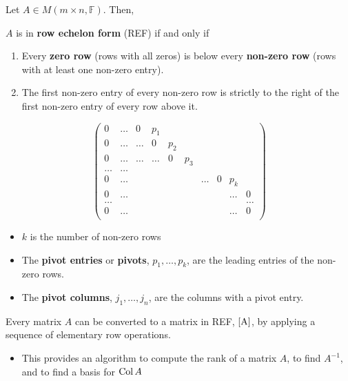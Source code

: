 \documentclass[letterpaper,12pt]{article}
\begin{document}
Let $A \in M(m \times n, \mathbb{F})$. Then,

\begin{definition}
$A$ is in \textbf{row echelon form} (REF) if and only if
\begin{enumerate}
    \item Every \textbf{zero row} (rows with all zeros) is below every \textbf{non-zero row} (rows with at least one non-zero entry).
    \item The first non-zero entry of every non-zero row is strictly to the right of the first non-zero entry of every row above it.
\end{enumerate}

\begin{equation*}
\begin{pmatrix}
    0 & \dots & 0 & p_1 & & & & & & \\
    0 & \dots & \dots & 0 & p_2 \\
    0 & \dots & \dots & \dots & 0 & p_3 \\
    \dots & \dots & & & & \\
    0 & \dots & & & & & \dots & 0 & p_k \\
    0 & \dots & & & & & & & \dots & 0 \\
    \dots & & & & & & & & & \dots \\
    0 & \dots & & & & & & & \dots & 0 \\
\end{pmatrix}  
\end{equation*}

\begin{itemize}
    \item $k$ is the number of non-zero rows
    \item The \textbf{pivot entries} or \textbf{pivots}, $p_1, \dots, p_k$, are the leading entries of the non-zero rows.
    \item The \textbf{pivot columns}, $j_1, \dots, j_n$, are the columns with a pivot entry.
\end{itemize}
\end{definition}

\begin{theorem}
Every matrix $A$ can be converted to a matrix in REF, $\ref{A}$, by applying a sequence of elementary row operations.
\begin{itemize}
    \item This provides an algorithm to compute the rank of a matrix $A$, to find $A^{-1}$, and to find a basis for $\operatorname{Col}{A}$
\end{itemize}
\end{theorem}
\end{document}
